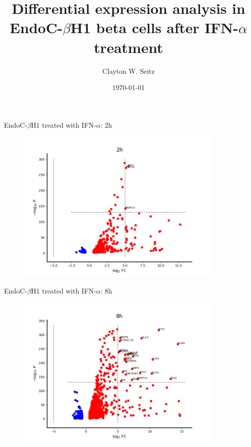 \documentclass{beamer}					%
\title{Differential expression analysis in EndoC-$\beta$H1 beta cells after IFN-$\alpha$ treatment}	%
\author{Clayton W. Seitz}								%
\date{\today}									%
\begin{document}
\begin{frame}
  \titlepage
\end{frame}


%

\begin{frame}{EndoC-$\beta$H1 treated with IFN-$\alpha$: 2h }


\begin{figure}
\includegraphics[width=10cm]{volcano-2h.png}
\end{figure}

\end{frame}

\begin{frame}{EndoC-$\beta$H1 treated with IFN-$\alpha$: 8h }

\begin{figure}
\includegraphics[width=10cm]{volcano-8h.png}
\end{figure}


\end{frame}
\end{document}

